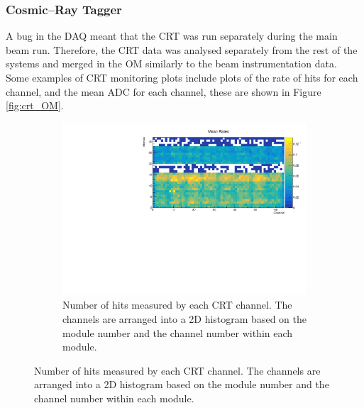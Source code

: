 \subsubsection*{Cosmic--Ray Tagger}
A bug in the DAQ meant that the CRT was run separately during the main beam 
run. Therefore, the CRT data was analysed separately from the rest of the 
\protodune{} systems and merged in the OM similarly to the beam instrumentation 
data. Some examples of CRT monitoring plots include plots of the rate of hits
for each channel, and the mean ADC for each channel, these are shown in Figure
\ref{fig:crt_OM}.

\begin{figure}

	\centering

	\begin{subfigure}[b]{0.8\textwidth}
		\centering
		\vspace{3mm}
		\includegraphics[width=\textwidth]{figures/crt_rate_om.pdf}
		\caption {Number of hits measured by each CRT channel. The channels are
		arranged into a 2D histogram based on the module number and the channel
		number within each module.}
		\label{fig:crt_rate_om}
	\end{subfigure}


\end{figure}
